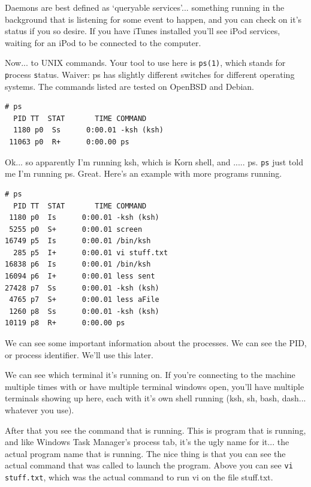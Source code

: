Daemons are best defined as `queryable services'... something running 
in the background that is listening for some event to happen, and 
you can check on it's status if you so desire. If you have iTunes installed
you'll see iPod services, waiting for an iPod to be connected to the computer.

Now... to UNIX commands. Your tool to use here is {\tt ps(1)}, which stands for
{\tt p}rocess {\tt s}tatus. Waiver: ps has slightly different switches for different
operating systems. The commands listed are tested on OpenBSD and Debian.

{\tt \begin{verbatim}
# ps
  PID TT  STAT       TIME COMMAND
  1180 p0  Ss      0:00.01 -ksh (ksh)
 11063 p0  R+      0:00.00 ps
\end{verbatim}
}

Ok... so apparently I'm running ksh, which is Korn shell, and ..... ps.  {\tt ps} 
just told me I'm running ps. Great. Here's an example with more programs running.

{\tt \begin{verbatim}
# ps    
  PID TT  STAT       TIME COMMAND
 1180 p0  Is      0:00.01 -ksh (ksh)
 5255 p0  S+      0:00.01 screen
16749 p5  Is      0:00.01 /bin/ksh
  285 p5  I+      0:00.01 vi stuff.txt
16838 p6  Is      0:00.01 /bin/ksh
16094 p6  I+      0:00.01 less sent
27428 p7  Ss      0:00.01 -ksh (ksh)
 4765 p7  S+      0:00.01 less aFile
 1260 p8  Ss      0:00.01 -ksh (ksh)
10119 p8  R+      0:00.00 ps
\end{verbatim}
}

We can see some important information about the processes. We can see
the PID, or process identifier. We'll use this later.

We can see which terminal it's running on. If you're connecting to the machine multiple times
with or have multiple terminal windows open, you'll have multiple terminals showing up here, each with it's own 
shell running (ksh, sh, bash, dash... whatever you use).

After that you see the command that is running.  This is program that is running, and like Windows
Task Manager's process tab, it's the ugly name for it... the actual program name that is running. The nice 
thing is that you can see the actual command that was called to launch the program. Above you can see {\tt vi stuff.txt}, 
which was the actual command to run vi on the file stuff.txt.

